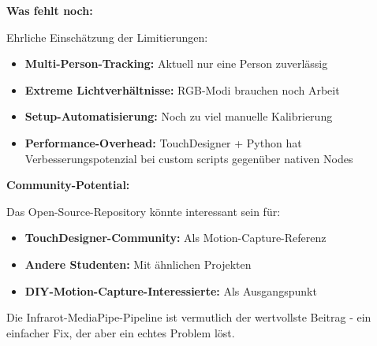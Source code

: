 \textbf{Was fehlt noch:}

Ehrliche Einschätzung der Limitierungen:
\begin{itemize}
    \item \textbf{Multi-Person-Tracking:} Aktuell nur eine Person zuverlässig
    \item \textbf{Extreme Lichtverhältnisse:} RGB-Modi brauchen noch Arbeit
    \item \textbf{Setup-Automatisierung:} Noch zu viel manuelle Kalibrierung
    \item \textbf{Performance-Overhead:} TouchDesigner + Python hat Verbesserungspotenzial bei custom scripts gegenüber nativen Nodes
\end{itemize}

\textbf{Community-Potential:}

Das Open-Source-Repository könnte interessant sein für:
\begin{itemize}
    \item \textbf{TouchDesigner-Community:} Als Motion-Capture-Referenz
    \item \textbf{Andere Studenten:} Mit ähnlichen Projekten
    \item \textbf{DIY-Motion-Capture-Interessierte:} Als Ausgangspunkt
\end{itemize}

Die Infrarot-MediaPipe-Pipeline ist vermutlich der wertvollste Beitrag - ein einfacher Fix, der aber ein echtes Problem löst.